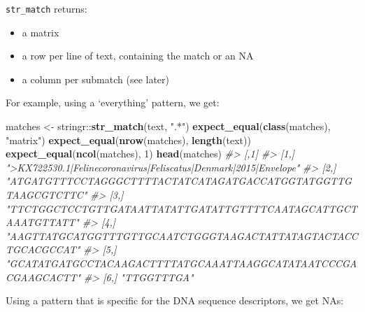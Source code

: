 \documentclass[]{book}
\newenvironment{Shaded}{}{}
\newcommand{\CommentTok}[1]{\textcolor[rgb]{0.38,0.63,0.69}{\textit{#1}}}
\newcommand{\DecValTok}[1]{\textcolor[rgb]{0.25,0.63,0.44}{#1}}
\newcommand{\KeywordTok}[1]{\textcolor[rgb]{0.00,0.44,0.13}{\textbf{#1}}}
\newcommand{\NormalTok}[1]{#1}
\newcommand{\OperatorTok}[1]{\textcolor[rgb]{0.40,0.40,0.40}{#1}}
\newcommand{\StringTok}[1]{\textcolor[rgb]{0.25,0.44,0.63}{#1}}
\providecommand{\tightlist}{%
  \setlength{\itemsep}{0pt}\setlength{\parskip}{0pt}}
\begin{document}
\texttt{str\_match} returns:

\begin{itemize}
\tightlist
\item
  a matrix
\item
  a row per line of text, containing the match or an NA
\item
  a column per submatch (see later)
\end{itemize}

For example, using a `everything' pattern, we get:

\begin{Shaded}
\begin{Highlighting}[]
\NormalTok{matches <-}\StringTok{ }\NormalTok{stringr}\OperatorTok{::}\KeywordTok{str_match}\NormalTok{(text, }\StringTok{".*"}\NormalTok{)}
\KeywordTok{expect_equal}\NormalTok{(}\KeywordTok{class}\NormalTok{(matches), }\StringTok{"matrix"}\NormalTok{)}
\KeywordTok{expect_equal}\NormalTok{(}\KeywordTok{nrow}\NormalTok{(matches), }\KeywordTok{length}\NormalTok{(text))}
\KeywordTok{expect_equal}\NormalTok{(}\KeywordTok{ncol}\NormalTok{(matches), }\DecValTok{1}\NormalTok{)}
\KeywordTok{head}\NormalTok{(matches)}
\CommentTok{#>      [,1]                                                            }
\CommentTok{#> [1,] ">KX722530.1|Felinecoronavirus|Feliscatus|Denmark|2015|Envelope"}
\CommentTok{#> [2,] "ATGATGTTTCCTAGGGCTTTTACTATCATAGATGACCATGGTATGGTTGTAAGCGTCTTC"  }
\CommentTok{#> [3,] "TTCTGGCTCCTGTTGATAATTATATTGATATTGTTTTCAATAGCATTGCTAAATGTTATT"  }
\CommentTok{#> [4,] "AAGTTATGCATGGTTTGTTGCAATCTGGGTAAGACTATTATAGTACTACCTGCACGCCAT"  }
\CommentTok{#> [5,] "GCATATGATGCCTACAAGACTTTTATGCAAATTAAGGCATATAATCCCGACGAAGCACTT"  }
\CommentTok{#> [6,] "TTGGTTTGA"}
\end{Highlighting}
\end{Shaded}

Using a pattern that is specific for the DNA sequence descriptors,
we get NAs:
\end{document}
